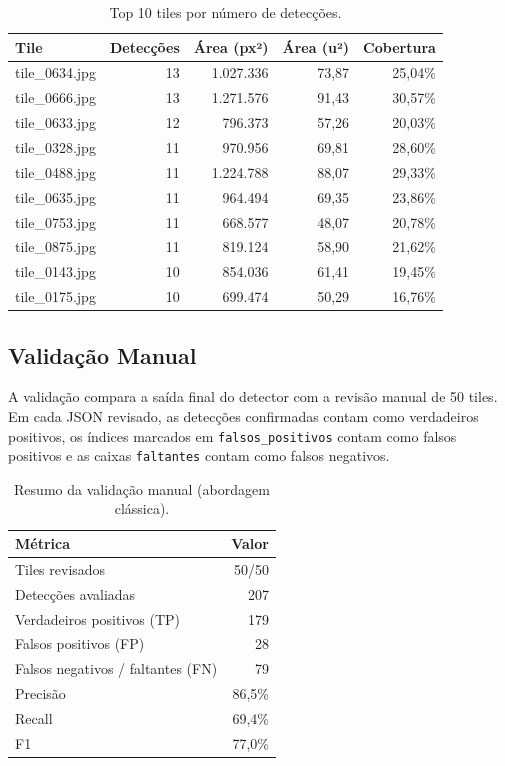 \documentclass[12pt, a4paper]{article}
\begin{document}
\begin{table}[H]
\centering
\caption{Top 10 tiles por número de detecções.}
\label{tab:top10}
\begin{tabular}{lrrrr}
\toprule
\textbf{Tile} & \textbf{Detecções} & \textbf{Área (px²)} & \textbf{Área (u²)} & \textbf{Cobertura} \\
\midrule
tile\_0634.jpg & 13 & 1.027.336 & 73,87 & 25,04\% \\
tile\_0666.jpg & 13 & 1.271.576 & 91,43 & 30,57\% \\
tile\_0633.jpg & 12 &   796.373 & 57,26 & 20,03\% \\
tile\_0328.jpg & 11 &   970.956 & 69,81 & 28,60\% \\
tile\_0488.jpg & 11 & 1.224.788 & 88,07 & 29,33\% \\
tile\_0635.jpg & 11 &   964.494 & 69,35 & 23,86\% \\
tile\_0753.jpg & 11 &   668.577 & 48,07 & 20,78\% \\
tile\_0875.jpg & 11 &   819.124 & 58,90 & 21,62\% \\
tile\_0143.jpg & 10 &   854.036 & 61,41 & 19,45\% \\
tile\_0175.jpg & 10 &   699.474 & 50,29 & 16,76\% \\
\bottomrule
\end{tabular}
\end{table}

\subsection{Validação Manual}

A validação compara a saída final do detector com a revisão manual de 50 tiles.
Em cada JSON revisado, as detecções confirmadas contam como verdadeiros
positivos, os índices marcados em \texttt{falsos\_positivos} contam como falsos
positivos e as caixas \texttt{faltantes} contam como falsos negativos.

\begin{table}[H]
\centering
\caption{Resumo da validação manual (abordagem clássica).}
\label{tab:validacao}
\begin{tabular}{lr}
\toprule
\textbf{Métrica} & \textbf{Valor} \\
\midrule
Tiles revisados & 50/50 \\
Detecções avaliadas & 207 \\
Verdadeiros positivos (TP) & 179 \\
Falsos positivos (FP) & 28 \\
Falsos negativos / faltantes (FN) & 79 \\
Precisão & 86,5\% \\
Recall & 69,4\% \\
F1 & 77,0\% \\
\bottomrule
\end{tabular}
\end{table}
\end{document}
